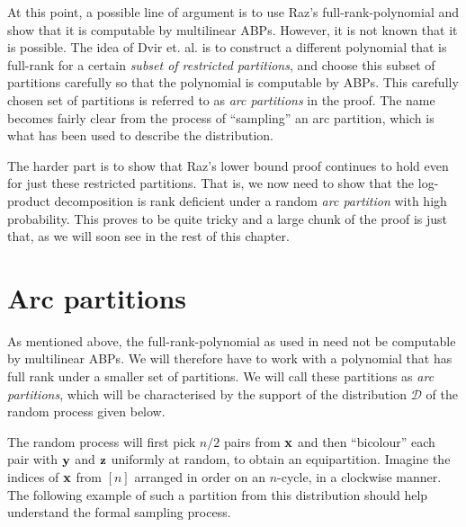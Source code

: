 At this point, a possible line of argument is to use Raz's full-rank-polynomial and show that it is computable by multilinear ABPs. However, it is not known that it is possible. The idea of Dvir et. al. is to construct a different polynomial that is full-rank for a certain \emph{subset of restricted partitions}, and choose this subset of partitions carefully so that the polynomial is computable by ABPs. 
This carefully chosen set of partitions is referred to as \emph{arc partitions} in the proof. The name becomes fairly clear from the process of ``sampling'' an arc partition, which is what has been used to describe the distribution.

The harder part is to show that Raz's lower bound proof continues to hold even for just these restricted partitions. That is, we now need to show that the log-product decomposition is rank deficient under a random \emph{arc partition} with high probability. This proves to be quite tricky and a large chunk of the proof is just that, as we will soon see in the rest of this chapter. 

\section{Arc partitions}

As mentioned above, the full-rank-polynomial as used in \cite{raz2004} need not be computable by multilinear ABPs. We will therefore have to work with a polynomial that has full rank under a smaller set of partitions. We will call these partitions as \emph{arc partitions}, which will be characterised by the support of the distribution $\mathcal{D}$ of the random process given below.

The random process will first pick $n/2$ pairs from $\mathbf{x}$ and then ``bicolour'' each pair with $\mathbf{y}$ and $\mathbf{z}$ uniformly at random, to obtain an equipartition. Imagine the indices of $\mathbf{x}$ from $[n]$ arranged in order on an $n$-cycle, in a clockwise manner. The following example of such a partition from this distribution should help understand the formal sampling process. 

\vspace{0.5em}


